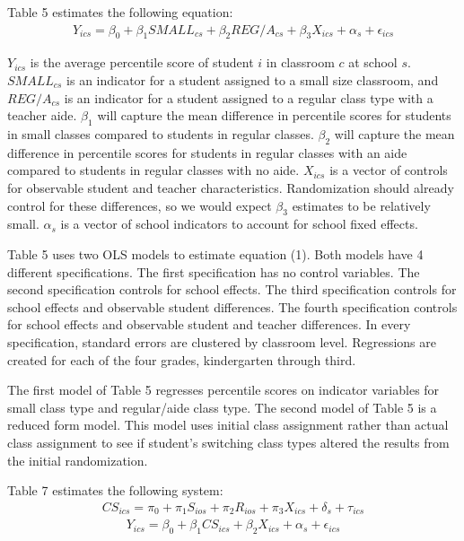 \documentclass[a4paper,11pt]{article}
\begin{document}
Table 5 estimates the following equation: 
\begin{align}
 Y_{ics} = \beta_{0} + \beta_{1}SMALL_{cs} + \beta_{2}REG/A_{cs} + \beta_{3}X_{ics} + \alpha_{s} + \epsilon_{ics}
\end{align}

$Y_{ics}$ is the average percentile score of student $i$ in classroom $c$ at school $s$. $SMALL_{cs}$ is an indicator for a student assigned to a small size classroom, and $REG/A_{cs}$ is an indicator for a student assigned to a regular class type with a teacher aide.  $\beta_{1}$ will capture the mean difference in percentile scores for students in small classes compared to students in regular classes. $\beta_{2}$ will capture the mean difference in percentile scores for students in regular classes with an aide compared to students in regular classes with no aide. $X_{ics}$ is a vector of controls for observable student and teacher characteristics. Randomization should already control for these differences, so we would expect $\beta_{3}$ estimates to be relatively small. $\alpha_{s}$ is a vector of school indicators to account for school fixed effects. \par

Table 5 uses two OLS models to estimate equation (1). Both models have 4 different specifications. The first specification has no control variables. The second specification controls for school effects. The third specification controls for school effects and observable student differences. The fourth specification controls for school effects and observable student and teacher differences. In every specification, standard errors are clustered by classroom level. Regressions are created for each of the four grades, kindergarten through third. \par

The first model of Table 5 regresses percentile scores on indicator variables for small class type and regular/aide class type.  The second model of Table 5 is a reduced form model. This model uses initial class assignment rather than actual class assignment to see if student's switching class types altered the results from the initial randomization. \par

Table 7 estimates the following system:
\begin{align}
CS_{ics} = \pi_{0} + \pi_{1}S_{ios} + \pi_{2}R_{ios} + \pi_{3}X_{ics} + \delta_{s} + \tau_{ics}
\end{align}
\begin{align}
Y_{ics} = \beta_{0} + \beta_{1}CS_{ics} + \beta_{2}X_{ics} + \alpha_{s} + \epsilon_{ics}
\end{align}
\end{document}
